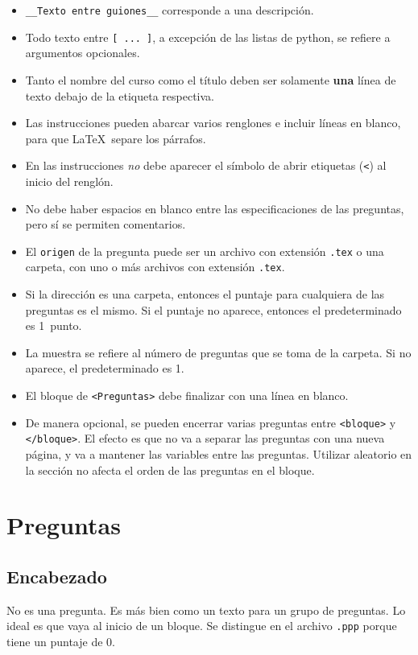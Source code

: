 \documentclass[12pt]{article}
\theoremstyle{definition}
\begin{document}
\begin{itemize}
  \item \verb|__Texto entre guiones__| corresponde a una descripción.
  \item Todo texto entre \verb|[ ... ]|, a excepción de las listas de python, se refiere a argumentos opcionales.
  \item Tanto el nombre del curso como el título deben ser solamente \textbf{una} línea de texto debajo de la etiqueta respectiva.
  \item Las instrucciones pueden abarcar varios renglones e incluir líneas en blanco, para que \LaTeX\ separe los párrafos. 
  \item En las instrucciones \emph{no} debe aparecer el símbolo de abrir etiquetas (\verb|<|) al inicio del renglón.
  \item No debe haber espacios en blanco entre las especificaciones de las preguntas, pero sí se permiten comentarios.
  \item El \verb|origen| de la pregunta puede ser un archivo con extensión \verb|.tex| o una carpeta, con uno o más archivos con extensión \verb|.tex|.
  \item Si la dirección es una carpeta, entonces el puntaje para cualquiera de las preguntas es el mismo. Si el puntaje no aparece, entonces el predeterminado es 1~punto.
  \item La muestra se refiere al número de preguntas que se toma de la carpeta. Si no aparece, el predeterminado es 1.
  \item El bloque de \verb|<Preguntas>| debe finalizar con una línea en blanco.
  \item De manera opcional, se pueden encerrar varias preguntas entre \verb|<bloque>| y \verb|</bloque>|. El efecto es que no va a separar las preguntas con una nueva página, y va a mantener las variables entre las preguntas. Utilizar aleatorio en la sección no afecta el orden de las preguntas en el bloque.
\end{itemize}

\section{Preguntas}

\subsection{Encabezado}
No es una pregunta. Es más bien como un texto para un grupo de preguntas. Lo ideal es que vaya al inicio de un bloque. Se distingue en el archivo \verb|.ppp| porque tiene un puntaje de 0.
\end{document}
